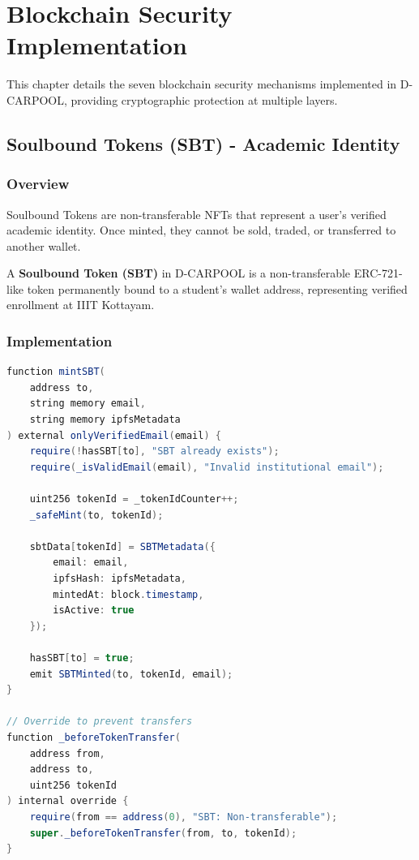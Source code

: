 \chapter{Blockchain Security Implementation}

This chapter details the seven blockchain security mechanisms implemented in D-CARPOOL, providing cryptographic protection at multiple layers.

\section{Soulbound Tokens (SBT) - Academic Identity}

\subsection{Overview}

Soulbound Tokens are non-transferable NFTs that represent a user's verified academic identity. Once minted, they cannot be sold, traded, or transferred to another wallet.

\begin{definition}
A \textbf{Soulbound Token (SBT)} in D-CARPOOL is a non-transferable ERC-721-like token permanently bound to a student's wallet address, representing verified enrollment at IIIT Kottayam.
\end{definition}

\subsection{Implementation}

\begin{lstlisting}[language=Java, caption=SBT Minting Function]
function mintSBT(
    address to,
    string memory email,
    string memory ipfsMetadata
) external onlyVerifiedEmail(email) {
    require(!hasSBT[to], "SBT already exists");
    require(_isValidEmail(email), "Invalid institutional email");
    
    uint256 tokenId = _tokenIdCounter++;
    _safeMint(to, tokenId);
    
    sbtData[tokenId] = SBTMetadata({
        email: email,
        ipfsHash: ipfsMetadata,
        mintedAt: block.timestamp,
        isActive: true
    });
    
    hasSBT[to] = true;
    emit SBTMinted(to, tokenId, email);
}

// Override to prevent transfers
function _beforeTokenTransfer(
    address from,
    address to,
    uint256 tokenId
) internal override {
    require(from == address(0), "SBT: Non-transferable");
    super._beforeTokenTransfer(from, to, tokenId);
}
\end{lstlisting}

